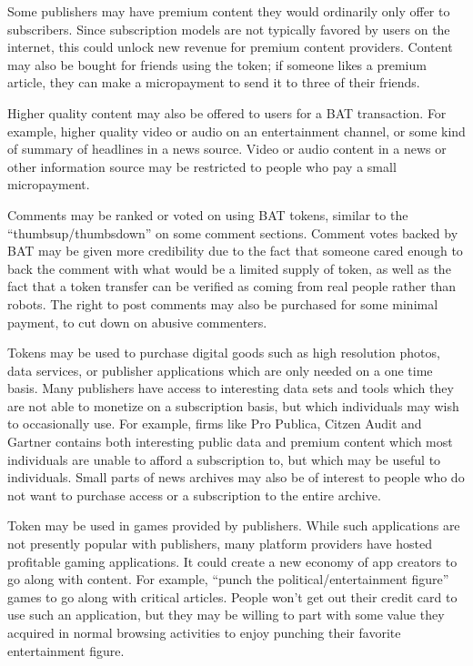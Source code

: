 \documentclass[11pt]{article}
\begin{document}
Some publishers may have premium content they would ordinarily only offer to subscribers. Since subscription models are not typically favored by users on the internet, this could unlock new revenue for premium content providers. Content may also be bought for friends using the token; if someone likes a premium article, they can make a micropayment to send it to three of their friends.

Higher quality content may also be offered to users for a BAT transaction. For example, higher quality video or audio on an entertainment channel, or some kind of summary of headlines in a news source. Video or audio content in a news or other information source may be restricted to people who pay a small micropayment.

Comments may be ranked or voted on using BAT tokens, similar to the “thumbsup/thumbsdown” on some comment sections. Comment votes backed by BAT may be given more credibility due to the fact that someone cared enough to back the comment with what would be a limited supply of token, as well as the fact that a token transfer can be verified as coming from real people rather than robots. The right to post comments may also be purchased for some minimal payment, to cut down on abusive commenters.

Tokens may be used to purchase digital goods such as high resolution photos, data services, or publisher applications which are only needed on a one time basis. Many publishers have access to interesting data sets and tools which they are not able to monetize on a subscription basis, but which individuals may wish to occasionally use. For example, firms like Pro Publica, Citzen Audit and Gartner contains both interesting public data and premium content which most individuals are unable to afford a subscription to, but which may be useful to individuals. Small parts of news archives may also be of interest to people who do not want to purchase access or a subscription to the entire archive.

Token may be used in games provided by publishers. While such applications are not presently popular with publishers, many platform providers have hosted profitable gaming applications. It could create a new economy of app creators to go along with content. For example, “punch the political/entertainment figure” games to go along with critical articles. People won’t get out their credit card to use such an application, but they may be willing to part with some value they acquired in normal browsing activities to enjoy punching their favorite entertainment figure.
\end{document}
